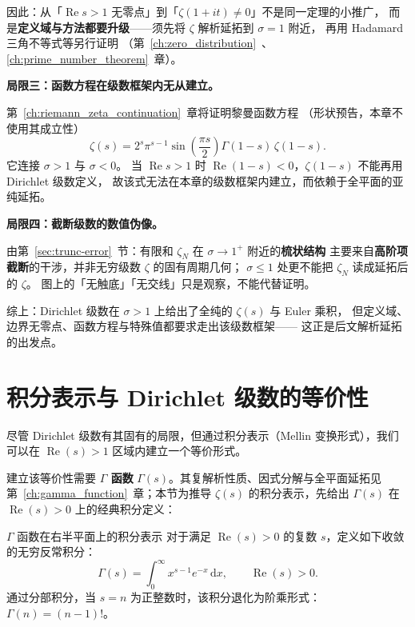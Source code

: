 因此：从「$\operatorname{Re}s>1$ 无零点」到「$\zeta(1+it)\neq 0$」不是同一定理的小推广，
而是\textbf{定义域与方法都要升级}——须先将 $\zeta$ 解析延拓到 $\sigma=1$ 附近，
再用 Hadamard 三角不等式等另行证明
（第~\ref{ch:zero_distribution}~、\ref{ch:prime_number_theorem}~章）。

\medskip
\textbf{局限三：函数方程在级数框架内无从建立。}

第~\ref{ch:riemann_zeta_continuation}~章将证明黎曼函数方程
（形状预告，本章不使用其成立性）
\[
  \zeta(s) = 2^s \pi^{s-1} \sin\!\left(\frac{\pi s}{2}\right)
             \Gamma(1-s)\, \zeta(1-s).
\]
它连接 $\sigma>1$ 与 $\sigma<0$。
当 $\operatorname{Re}s>1$ 时 $\operatorname{Re}(1-s)<0$，$\zeta(1-s)$ 不能再用 Dirichlet 级数定义，
故该式无法在本章的级数框架内建立，而依赖于全平面的亚纯延拓。

\medskip
\textbf{局限四：截断级数的数值伪像。}

由第~\ref{sec:trunc-error}~节：有限和 $\zeta_N$ 在 $\sigma\to 1^+$ 附近的\textbf{梳状结构}
主要来自\textbf{高阶项截断}的干涉，并非无穷级数 $\zeta$ 的固有周期几何；
$\sigma\le 1$ 处更不能把 $\zeta_N$ 读成延拓后的 $\zeta$。
图上的「无触底」「无交线」只是观察，不能代替证明。

\medskip
综上：Dirichlet 级数在 $\sigma>1$ 上给出了全纯的 $\zeta(s)$ 与 Euler 乘积，
但定义域、边界无零点、函数方程与特殊值都要求走出该级数框架——
这正是后文解析延拓的出发点。

\section{积分表示与 Dirichlet 级数的等价性}\label{sec:integral-representation-eq}

尽管 Dirichlet 级数有其固有的局限，但通过积分表示（Mellin 变换形式），我们可以在 $\operatorname{Re}(s)>1$ 区域内建立一个等价形式。

建立该等价性需要 \textbf{$\Gamma$ 函数} $\Gamma(s)$。其复解析性质、因式分解与全平面延拓见第~\ref{ch:gamma_function}~章；本节为推导 $\zeta(s)$ 的积分表示，先给出 $\Gamma(s)$ 在 $\operatorname{Re}(s)>0$ 上的经典积分定义：

\begin{definition}{$\Gamma$ 函数在右半平面上的积分表示}{}
对于满足 $\operatorname{Re}(s)>0$ 的复数 $s$，定义如下收敛的无穷反常积分：
\begin{equation}
    \Gamma(s) = \int_0^\infty x^{s-1}e^{-x}\,\mathrm{d}x, \qquad \operatorname{Re}(s)>0.
    \label{eq:gamma-def-ch4}
\end{equation}
通过分部积分，当 $s=n$ 为正整数时，该积分退化为阶乘形式：$\Gamma(n)=(n-1)!$。
\end{definition}

